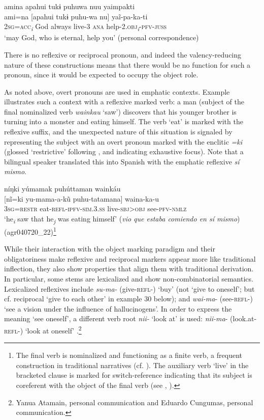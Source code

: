 \documentclass[output=paper]{langscibook}
\begin{document}
\ea%
    \label{ex:overall:15}
    \glll amina apahui tukɨ puhuwa nuu yaimpakti\\
  ami=na [apahui tukɨ puhu-wa nu] yaĩ-pa-ka-ti\\  2\textsc{sg=acc}\textit{\textsubscript{i}}  God  always  live\textsc{{}-3} \textsc{ana} help-\textsc{2.obj}\textit{\textsubscript{i}}\textsc{{}-pfv-juss}\\
  \glt  ‘may God, who is eternal, help you’ (personal correspondence)
\z

There is no reflexive or reciprocal pronoun, and indeed the valency-reducing nature of these constructions means that there would be no function for such a pronoun, since it would be expected to occupy the object role.

As noted above, overt pronouns are used in emphatic contexts. Example  illustrates such a context with a reflexive marked verb: a man (subject of the final nominalized verb \textit{wainkau} ‘saw’) discovers that his younger brother is turning into a monster and eating himself. The verb ‘eat’ is marked with the reflexive suffix, and the unexpected nature of this situation is signaled by representing the subject with an overt pronoun marked with the enclitic \textit{=ki} (glossed ‘restrictive’ following \citealt{Overall2017}, and indicating exhaustive focus). Note that a bilingual speaker translated this into Spanish with the emphatic reflexive \textit{sí mismo}.

\ea%
    \label{ex:overall:16}
    \glll níŋki yúmamak puhúttaman wainkáu\\
  {}[nĩ=ki  yu-mama-a-kũ  puhu-tatamana]  waina-ka-u\\
  3\textsc{sg}=\textsc{restr}  eat-\textsc{refl-ipfv-sim.3.ss}  live-\textsc{sbj>obj}  see-\textsc{pfv-nmlz}\\
  \glt  ‘he\textit{\textsubscript{i}} saw that he\textit{\textsubscript{j}} was eating himself’ (\textit{vio que estaba comiendo en sí mismo}) (agr040720\_22)\footnote{The final verb is nominalized and functioning as a finite verb, a frequent construction in traditional narratives (cf. ). The auxiliary verb ‘live’ in the bracketed clause is marked for switch-reference indicating that its subject is coreferent with the object of the final verb (see \citealt{Overall2017}, ).}
\z

While their interaction with the object marking paradigm and their obligatoriness make reflexive and reciprocal markers appear more like traditional inflection, they also show properties that align them with traditional derivation. In particular, some stems are lexicalized and show non-combinatorial semantics. Lexicalized reflexives include \textit{su-ma-} (give-\textsc{refl-}) ‘buy’ (not ‘give to oneself’; but cf. reciprocal ‘give to each other’ in example 30 below); and \textit{wai-ma}{}- (see-\textsc{refl-}) ‘see a vision under the influence of hallucinogens’. In order to express the meaning ‘see oneself’, a different verb root \textit{nii-} ‘look at’ is used: \textit{nii-ma}{}- (look.at-\textsc{refl-}) ‘look at oneself’
.\footnote{Yanua Atamain, personal communication and Eduardo Cungumas, personal communication.}
\end{document}
